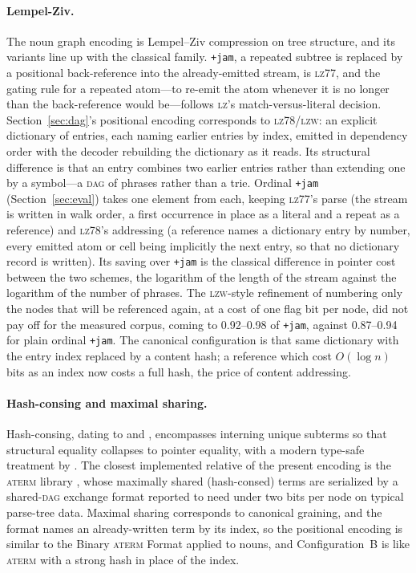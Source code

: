 \documentclass[twoside]{article}
\begin{document}
\paragraph*{Lempel-Ziv.}  The noun graph encoding is Lempel--Ziv compression on tree structure, and its variants line up with the classical family.  \texttt{+jam}, a repeated subtree is replaced by a positional back-reference into the already-emitted stream, is \textsc{lz}77, and the gating rule for a repeated atom---to re-emit the atom whenever it is no longer than the back-reference would be---follows \textsc{lz}'s match-versus-literal decision.  Section~\ref{sec:dag}'s positional encoding corresponds to \textsc{lz}78/\textsc{lzw}:  an explicit dictionary of entries, each naming earlier entries by index, emitted in dependency order with the decoder rebuilding the dictionary as it reads.  Its structural difference is that an entry combines two earlier entries rather than extending one by a symbol---a \textsc{dag} of phrases rather than a trie.  Ordinal \texttt{+jam} (Section~\ref{sec:eval}) takes one element from each, keeping \textsc{lz}77's parse (the stream is written in walk order, a first occurrence in place as a literal and a repeat as a reference) and \textsc{lz}78's addressing (a reference names a dictionary entry by number, every emitted atom or cell being implicitly the next entry, so that no dictionary record is written).  Its saving over \texttt{+jam} is the classical difference in pointer cost between the two schemes, the logarithm of the length of the stream against the logarithm of the number of phrases.  The \textsc{lzw}-style refinement of numbering only the nodes that will be referenced again, at a cost of one flag bit per node, did not pay off for the measured corpus, coming to 0.92--0.98 of \texttt{+jam}, against 0.87--0.94 for plain ordinal \texttt{+jam}.  The canonical configuration is that same dictionary with the entry index replaced by a content hash; a reference which cost $O(\log n)$ bits as an index now costs a full hash, the price of content addressing.

\sloppy
\paragraph*{Hash-consing and maximal sharing.}  Hash-consing, dating to \citet{Ershov1958} and \citet{Goto1974}, encompasses interning unique subterms so that structural equality collapses to pointer equality, with a modern type-safe treatment by \citet{Filliatre2006}.  The closest implemented relative of the present encoding is the \textsc{aterm} library \citep{vandenBrand2000}, whose maximally shared (hash-consed) terms are serialized by a shared-\textsc{dag} exchange format reported to need under two bits per node on typical parse-tree data.  Maximal sharing corresponds to canonical graining, and the format names an already-written term by its index, so the positional encoding is similar to the Binary \textsc{aterm} Format applied to nouns, and Configuration~B is like \textsc{aterm} with a strong hash in place of the index.
\end{document}
